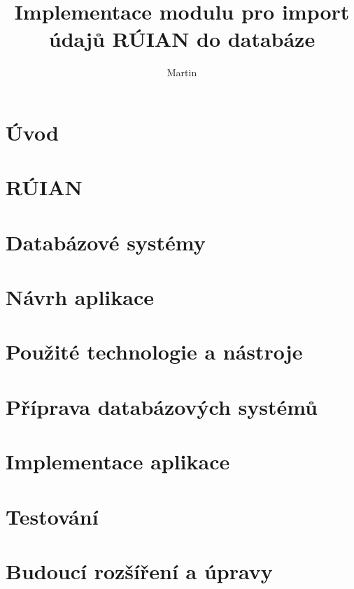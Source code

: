 \documentclass[czech, kiv, ba, he, iso690numb, pdf, viewonly]{fasthesis}
\title{Implementace modulu pro import údajů RÚIAN do databáze}
\author{Martin}{Schön}{}{}
\begin{document}
\frontpages[tm]
\tableofcontents

\chapter{Úvod}


\chapter{RÚIAN}


\chapter{Databázové systémy}


\chapter{Návrh aplikace}


\chapter{Použité technologie a nástroje}


\chapter{Příprava databázových systémů}


\chapter{Implementace aplikace}





\chapter{Testování}


\chapter{Budoucí rozšíření a úpravy}

\end{document}
